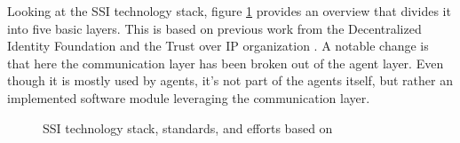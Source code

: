     	Looking at the \ac{SSI} technology stack, figure \ref{figure: ssi_stack_detail} provides an overview that divides it into five basic layers. This is based on previous work from the Decentralized Identity Foundation and the Trust over IP organization \cite{heck_ssi_2020,hakan_yildiz_layers_2021, davie_0289_2021}. A notable change is that here the communication layer has been broken out of the agent layer. Even though it is mostly used by agents, it's not part of the agents itself, but rather an implemented software module leveraging the communication layer.
    	
		\begin{figure}[h]
            \centering
            \caption{\ac{SSI} technology stack, standards, and efforts based on  \cite{heck_ssi_2020, yildiz_layers_2021,davie_0289_2021}}
            \label{figure: ssi_stack_detail}
        \end{figure}
        
